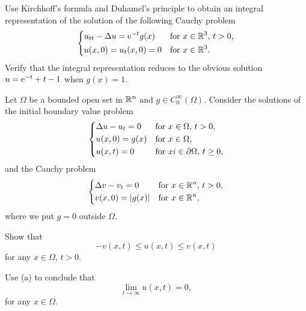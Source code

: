 \begin{problem}
  Use Kirchhoff's formula and Duhamel's principle to obtain an integral
  representation of the solution of the following Cauchy problem
  \[
    \left\{
      \begin{aligned}
        &u_{tt}-\Delta u=\mathrm{e}^{-t} g(x)&&\text{for \(x\in\mathbb{R}^3\), \(t>0\),}\\
        &u(x,0)=u_t(x,0)=0&&\text{for \(x\in\mathbb{R}^3\).}
      \end{aligned}
    \right.
  \]
  Verify that the integral representation reduces to the obvious solution
  \(u=\mathrm{e}^{-t}+t-1\) when \(g(x)=1\).
\end{problem}
\begin{solution*}
\end{solution*}

\begin{problem}
  Let \(\Omega\) be a bounded open set in \(\mathbb{R}^n\) and \(g\in
  C_0^\infty(\Omega)\). Consider the solutions of the initial boundary
  value problem
  \[
    \left\{
      \begin{aligned}
        &\Delta u-u_t=0&&\text{for \(x\in\Omega\), \(t>0\),}\\
        &u(x,0)=g(x)&&\text{for \(x\in\Omega\),}\\
        &u(x,t)=0&&\text{for \(xi\in\partial\Omega\), \(t\geq 0\),}
      \end{aligned}
    \right.
  \]
  and the Cauchy problem
  \[
    \left\{
      \begin{aligned}
        &\Delta v-v_t=0&&\text{for \(x\in\mathbb{R}^n\), \(t>0\),}\\
        &v(x,0)=|g(x)|&&\text{for \(x\in\mathbb{R}^n\),}
      \end{aligned}
    \right.
  \]
  where we put \(g=0\) outside \(\Omega\).
  \begin{alphlist}
  \item Show that
    \[
      -v(x,t)\leq u(x,t)\leq v(x,t)
    \]
    for any \(x\in\Omega\), \(t>0\).
  \item Use (a) to conclude that
    \[
      \lim_{t\to\infty} u(x,t)=0,
    \]
    for any \(x\in\Omega\).
  \end{alphlist}
\end{problem}
\begin{solution*}
\end{solution*}

